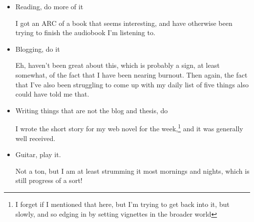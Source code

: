 \documentclass[12pt]{article}
\renewcommand{\,}{\textsuperscript{,}}
\begin{document}
\begin{itemize}
\begin{itemize}
\begin{itemize}
I think that once I get all of the letters above 5 characters per second\footnote{I forget what the conversion from cps to wpm is, but let's double check.}

Oh gosh, my top is only 90 words per minute, and my average is around 60.  
I don't know why that feels horribly slow, except that I know so many people with over 100 wpm times.  
Then again, they tend to do them in more natural settings, where words flow from each other in some sensible manner.  
I'm happy with the progress, but going to keep it in CPS for the future.

Since they define one word as five characters\footnote{which is apparently standardized}, only when all of my letters are at or above 60 wpm\footnote{which feels weird, rifght??} will I start to worry about capitalization and punctuation.

\item Reading, do more of it

I got an ARC of a book that seems interesting, and have otherwise been trying to finish the audiobook I'm listening to.

\item Blogging, do it

Eh, haven't been great about this, which is probably a sign, at least somewhat, of the fact that I have been nearing burnout.  
Then again, the fact that I've also been struggling to come up with my daily list of five things also could have told me that.

\item Writing things that are not the blog and thesis, do

I wrote the short story for my web novel for the week,\footnote{I forget if I mentioned that here, but I'm trying to get back into it, but slowly, and so edging in by setting vignettes in the broader world} and it was generally well received.

\item Guitar, play it.

Not a ton, but I am at least strumming it most mornings and nights, which is still progress of a sort!

\end{itemize}

\end{itemize}

\end{itemize}
\end{document}
